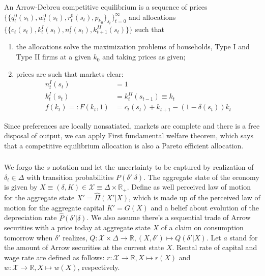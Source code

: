 \documentclass[]{article}
\begin{document}
An Arrow-Debreu competitive equilibrium is a sequence of prices $\{\{q_t^0(s_t), w_t^0(s_t), r_t^0(s_t), p_{k_0}\}_{s_t}\}_{t = 0}^\infty$ and allocations $\{\{c_t(s_t), k_t^I(s_t), n_t^I(s_t), k_{t+1}^{II}(s_t)\}\}$ such that
\begin{enumerate}[label=\roman*)]
	\item the allocations solve the maximization problems of households, Type I and Type II firms at a given $k_0$ and taking prices as given;
	\item prices are such that markets clear:
	\begin{equation}
		\begin{split}
			n_t^I(s_t)& = 1 \\ \nonumber
			k_t^I(s_t)& = k_t^{II}(s_{t-1}) \equiv k_t \\
			f(k_t) =: F(k_t, 1)& = c_t(s_t) + k_{t+1} - (1 - \delta(s_t))k_t
		\end{split}
	\end{equation}
\end{enumerate}
Since preferences are locally nonsatiated, markets are complete and there is a free disposal of output, we can apply First fundamental welfare theorem, which says that a competitive equilibrium allocation is also a Pareto efficient allocation.

\subsubsection{}
We forgo the $s$ notation and let the uncertainty to be captured by realization of $\delta_t\in\Delta$ with transition probabilities $P(\delta'|\delta)$. The aggregate state of the economy is given by $X \equiv (\delta, K)\in\mathcal{X}\equiv\Delta\times\mathbb{R}_+$. Define as well perceived law of motion for the aggregate state $X' = \hat{\Pi}(X'|X)$, which is made up of the perceived law of motion for the aggregate capital $K' = G(X)$ and a belief about evolution of the depreciation rate $\hat{P}(\delta'|\delta)$. We also assume there's a sequential trade of Arrow securities with a price today at aggregate state $X$ of a claim on consumption tomorrow when $\delta'$ realizes, $Q:\mathcal{X}\times\Delta\to\mathbb{R}, (X, \delta')\mapsto Q(\delta'|X)$. Let $a$ stand for the amount of Arrow securities at the current state $X$. Rental rate of capital and wage rate are defined as follows: $r: \mathcal{X}\to\mathbb{R}, X\mapsto r(X)$ and $w:\mathcal{X}\to\mathbb{R}, X\mapsto w(X)$, respectively.
\end{document}
